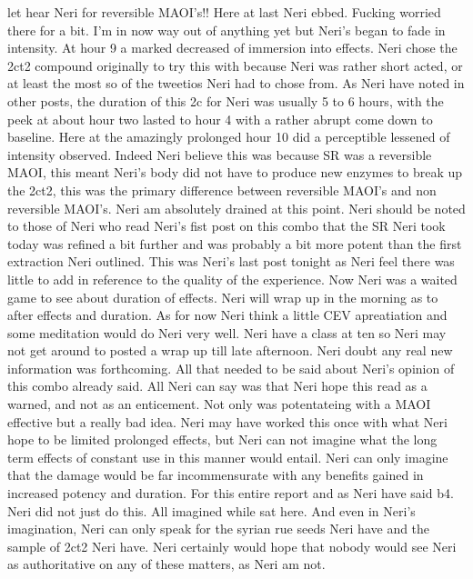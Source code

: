 \documentclass[12pt]{book}
\begin{document}
let hear Neri for reversible MAOI's!! Here at last Neri ebbed. Fucking worried there for a bit. I'm in now way out of anything yet but Neri's began to fade in intensity. At hour 9 a marked decreased of immersion into effects. Neri chose the 2ct2 compound originally to try this with because Neri was rather short acted, or at least the most so of the tweetios Neri had to chose from. As Neri have noted in other posts, the duration of this 2c for Neri was usually 5 to 6 hours, with the peek at about hour two lasted to hour 4 with a rather abrupt come down to baseline. Here at the amazingly prolonged hour 10 did a perceptible lessened of intensity observed. Indeed Neri believe this was because SR was a reversible MAOI, this meant Neri's body did not have to produce new enzymes to break up the 2ct2, this was the primary difference between reversible MAOI's and non reversible MAOI's. Neri am absolutely drained at this point. Neri should be noted to those of Neri who read Neri's fist post on this combo that the SR Neri took today was refined a bit further and was probably a bit more potent than the first extraction Neri outlined. This was Neri's last post tonight as Neri feel there was little to add in reference to the quality of the experience. Now Neri was a waited game to see about duration of effects. Neri will wrap up in the morning as to after effects and duration. As for now Neri think a little CEV apreatiation and some meditation would do Neri very well. Neri have a class at ten so Neri may not get around to posted a wrap up till late afternoon. Neri doubt any real new information was forthcoming. All that needed to be said about Neri's opinion of this combo already said. All Neri can say was that Neri hope this read as a warned, and not as an enticement. Not only was potentateing with a MAOI effective but a really bad idea. Neri may have worked this once with what Neri hope to be limited prolonged effects, but Neri can not imagine what the long term effects of constant use in this manner would entail. Neri can only imagine that the damage would be far incommensurate with any benefits gained in increased potency and duration. For this entire report and as Neri have said b4. Neri did not just do this. All imagined while sat here. And even in Neri's imagination, Neri can only speak for the syrian rue seeds Neri have and the sample of 2ct2 Neri have. Neri certainly would hope that nobody would see Neri as authoritative on any of these matters, as Neri am not.
\end{document}
